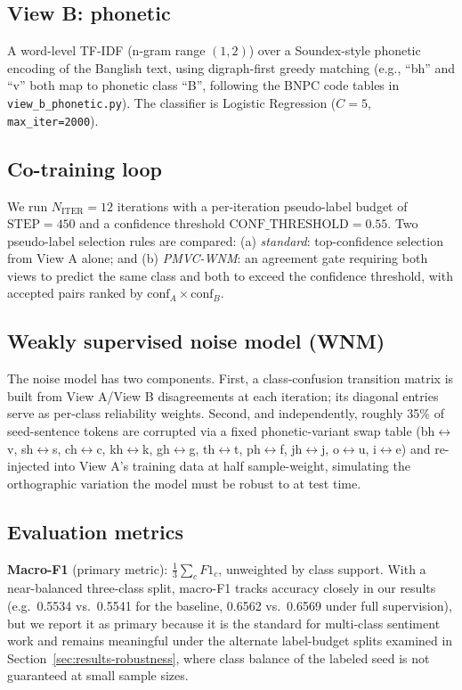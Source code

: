 \documentclass[conference]{IEEEtran}
\begin{document}
\subsection{View B: phonetic}

A word-level TF-IDF (n-gram range $(1,2)$) over a Soundex-style phonetic
encoding of the Banglish text, using digraph-first greedy matching (e.g.,
``bh'' and ``v'' both map to phonetic class ``B'', following the BNPC code
tables in \texttt{view\_b\_phonetic.py}). The classifier is Logistic
Regression ($C=5$, \texttt{max\_iter=2000}).

\subsection{Co-training loop}

We run $N_{\text{ITER}}=12$ iterations with a per-iteration pseudo-label
budget of $\text{STEP}=450$ and a confidence threshold
$\text{CONF\_THRESHOLD}=0.55$. Two pseudo-label selection rules are compared:
(a) \emph{standard}: top-confidence selection from View A alone; and (b)
\emph{PMVC-WNM}: an agreement gate requiring both views to predict the same
class and both to exceed the confidence threshold, with accepted pairs ranked
by $\text{conf}_A \times \text{conf}_B$.

\subsection{Weakly supervised noise model (WNM)}

The noise model has two components. First, a class-confusion transition
matrix is built from View A/View B disagreements at each iteration; its
diagonal entries serve as per-class reliability weights. Second, and
independently, roughly 35\% of seed-sentence tokens are corrupted via a fixed
phonetic-variant swap table (bh$\leftrightarrow$v, sh$\leftrightarrow$s,
ch$\leftrightarrow$c, kh$\leftrightarrow$k, gh$\leftrightarrow$g,
th$\leftrightarrow$t, ph$\leftrightarrow$f, jh$\leftrightarrow$j,
o$\leftrightarrow$u, i$\leftrightarrow$e) and re-injected into View A's
training data at half sample-weight, simulating the orthographic variation
the model must be robust to at test time.

\subsection{Evaluation metrics}

\textbf{Macro-F1} (primary metric): $\frac{1}{3}\sum_c F1_c$, unweighted by
class support. With a near-balanced three-class split, macro-F1 tracks
accuracy closely in our results (e.g.\ 0.5534 vs.\ 0.5541 for the baseline,
0.6562 vs.\ 0.6569 under full supervision), but we report it as primary
because it is the standard for multi-class sentiment work and remains
meaningful under the alternate label-budget splits examined in
Section~\ref{sec:results-robustness}, where class balance of the labeled seed
is not guaranteed at small sample sizes.
\end{document}
